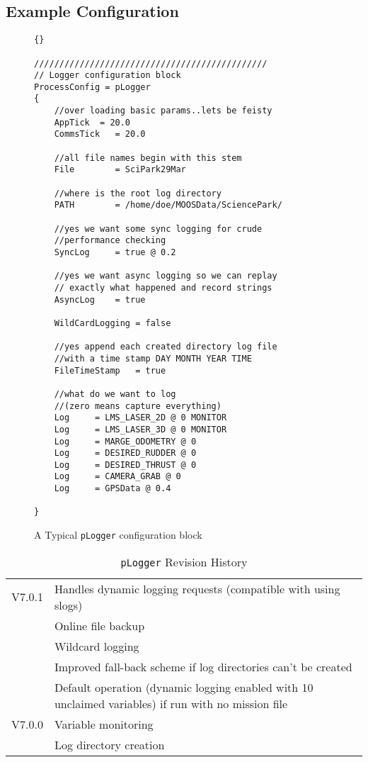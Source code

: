 \documentclass[a4paper,10pt]{article}
\newcommand{\Code}[1]{\texttt{#1} }
\newcommand{\code}[1]{\Code{#1} }
\begin{document}
\subsection{Example Configuration}
\begin{figure}[ht!]
\begin{lstlisting}[]{}

//////////////////////////////////////////////
// Logger configuration block
ProcessConfig = pLogger
{
    //over loading basic params..lets be feisty
    AppTick  = 20.0
    CommsTick   = 20.0

    //all file names begin with this stem
    File        = SciPark29Mar

    //where is the root log directory
    PATH        = /home/doe/MOOSData/SciencePark/

    //yes we want some sync logging for crude
    //performance checking
    SyncLog     = true @ 0.2

    //yes we want async logging so we can replay
    // exactly what happened and record strings
    AsyncLog    = true

    WildCardLogging = false

    //yes append each created directory log file
    //with a time stamp DAY MONTH YEAR TIME
    FileTimeStamp   = true

    //what do we want to log
    //(zero means capture everything)
    Log     = LMS_LASER_2D @ 0 MONITOR
    Log     = LMS_LASER_3D @ 0 MONITOR
    Log     = MARGE_ODOMETRY @ 0
    Log     = DESIRED_RUDDER @ 0
    Log     = DESIRED_THRUST @ 0
    Log     = CAMERA_GRAB @ 0
    Log     = GPSData @ 0.4

}

\end{lstlisting}
\caption{A Typical \code{pLogger} configuration block}
\label{fig:LoggerConfig}
\end{figure}


\begin{table}[ht!]
  \centering
  \caption{\code{pLogger} Revision History}
  \begin{tabular}{|l|p{10cm}|}
    \hline
    V7.0.1 & Handles dynamic logging requests (compatible with using slogs)\\
     & Online file backup \\
     & Wildcard logging \\
     & Improved fall-back scheme if log directories can't be created \\
     & Default operation (dynamic logging enabled with 10 unclaimed variables) if run with no mission file\\
    V7.0.0 & Variable monitoring \\
     & Log directory creation \\
    \hline
  \end{tabular}
\label{Tab:RevisionHistory}
\end{table}
\end{document}
